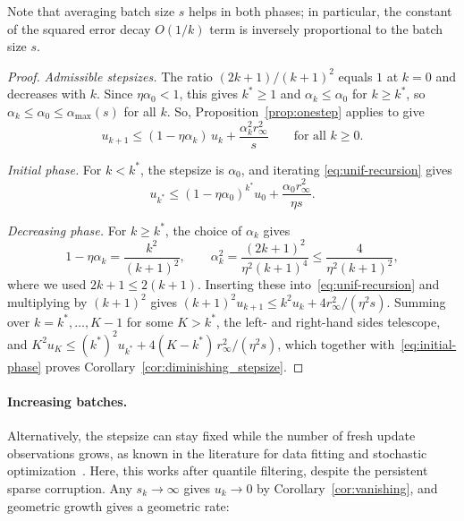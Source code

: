 \documentclass[pdflatex,sn-mathphys-num]{sn-jnl}
\theoremstyle{thmstyleone}
\theoremstyle{thmstylethree}
\begin{document}
Note that averaging batch size $s$ helps in both phases; in particular, the constant of the squared error decay 
$O(1/k)$ term is inversely proportional to the batch size $s$.
\begin{proof}
\emph{Admissible stepsizes.} The ratio $(2k+1)/(k+1)^2$ equals $1$ at $k=0$
and decreases with $k$. Since $\eta\alpha_0<1$, this gives $k^*\ge1$ and
$\alpha_k\le\alpha_0$ for $k\ge k^*$, so $\alpha_k\le\alpha_0\le\alpha_{\max}(s)$
for all $k$. So, Proposition~\ref{prop:onestep} applies to give
\begin{equation}
\label{eq:unif-recursion}
u_{k+1}\le(1-\eta\alpha_k)\,u_k+\frac{\alpha_k^2r_\infty^2}{s}
\qquad\text{for all }k\ge0.
\end{equation}

\emph{Initial phase.}  For $k<k^*$, the stepsize is $\alpha_0$, and iterating
\eqref{eq:unif-recursion} gives
\begin{equation}\label{eq:initial-phase}
u_{k^*}\le(1-\eta\alpha_0)^{k^*}u_0
+\frac{\alpha_0r_\infty^2}{\eta s}.
\end{equation}

\emph{Decreasing phase.} For $k\ge k^*$, the choice of $\alpha_k$ gives
\[
1-\eta\alpha_k=\frac{k^2}{(k+1)^2},
\qquad
\alpha_k^2=\frac{(2k+1)^2}{\eta^2(k+1)^4}\le\frac{4}{\eta^2(k+1)^2},
\]
where we used $2k+1\le2(k+1)$. Inserting these
into~\eqref{eq:unif-recursion} and multiplying by $(k+1)^2$ gives
$(k+1)^2u_{k+1}\le k^2u_k+4r_\infty^2/(\eta^2s)$. Summing over
$k=k^*,\dots,K-1$ for some $K>k^*$, the left- and right-hand sides telescope,
and $K^2u_K\le(k^*)^2u_{k^*}+4(K-k^*)\,r_\infty^2/(\eta^2s)$, which together
with~\eqref{eq:initial-phase} proves Corollary~\ref{cor:diminishing_stepsize}.
\end{proof}

\paragraph{Increasing batches.}
Alternatively, the stepsize can stay fixed while the number of fresh update
observations grows, as known in the literature for data fitting and
stochastic optimization~\cite{friedlander2012hybrid,smith2018dont}. Here, this
works after quantile filtering, despite the persistent sparse corruption. Any
$s_k\to\infty$ gives $u_k\to0$ by Corollary~\ref{cor:vanishing}, and geometric
growth gives a geometric rate:
\end{document}
